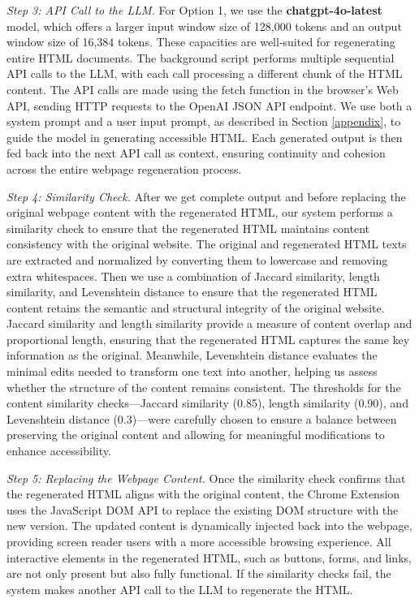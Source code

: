 \textit{Step 3: API Call to the LLM.} For Option 1, we use the \textbf{chatgpt-4o-latest} model, which offers a larger input window size of 128,000 tokens and an output window size of 16,384 tokens. These capacities are well-suited for regenerating entire HTML documents. The background script performs multiple sequential API calls to the LLM, with each call processing a different chunk of the HTML content. The API calls are made using the fetch function in the browser's Web API, sending HTTP requests to the OpenAI JSON API endpoint. We use both a system prompt and a user input prompt, as described in Section \ref{appendix}, to guide the model in generating accessible HTML. Each generated output is then fed back into the next API call as context, ensuring continuity and cohesion across the entire webpage regeneration process.

\textit{Step 4: Similarity Check.} After we get complete output and before replacing the original webpage content with the regenerated HTML, our system performs a similarity check to ensure that the regenerated HTML maintains content consistency with the original website. The original and regenerated HTML texts are extracted and normalized by converting them to lowercase and removing extra whitespaces. Then we use a combination of Jaccard similarity, length similarity, and Levenshtein distance to ensure that the regenerated HTML content retains the semantic and structural integrity of the original website. Jaccard similarity and length similarity provide a measure of content overlap and proportional length, ensuring that the regenerated HTML captures the same key information as the original. Meanwhile, Levenshtein distance evaluates the minimal edits needed to transform one text into another, helping us assess whether the structure of the content remains consistent. The thresholds for the content similarity checks—Jaccard similarity (0.85), length similarity (0.90), and Levenshtein distance (0.3)—were carefully chosen to ensure a balance between preserving the original content and allowing for meaningful modifications to enhance accessibility. 

\textit{Step 5: Replacing the Webpage Content.} Once the similarity check confirms that the regenerated HTML aligns with the original content, the Chrome Extension uses the JavaScript DOM API to replace the existing DOM structure with the new version. The updated content is dynamically injected back into the webpage, providing screen reader users with a more accessible browsing experience. All interactive elements in the regenerated HTML, such as buttons, forms, and links, are not only present but also fully functional. If the similarity checks fail, the system makes another API call to the LLM to regenerate the HTML.

